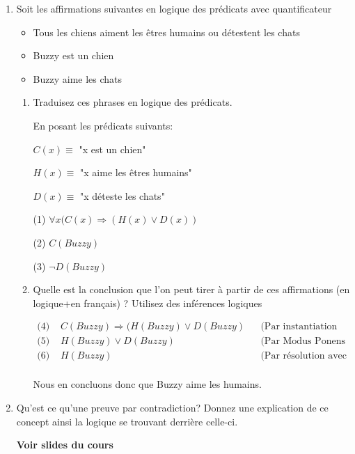 \documentclass[A4paper,11pt]{article}
\begin{document}
\begin{enumerate}
    \item Soit les affirmations suivantes en logique des prédicats avec quantificateur
    \begin{itemize}
        \item Tous les chiens aiment les êtres humains ou détestent les chats
        \item Buzzy est un chien
        \item Buzzy aime les chats
    \end{itemize}
    \begin{enumerate}
        \item Traduisez ces phrases en logique des prédicats.
        
        En posant les prédicats suivants:
        
        $C(x) \equiv$ "x est un chien"
        
        $H(x) \equiv$ "x aime les êtres humains"
        
        $D(x) \equiv$ "x déteste les chats"
        
        (1) $\forall x (C(x) \Rightarrow (H(x) \lor D(x))$
        
        (2) $C(Buzzy)$
        
        (3) $\neg D(Buzzy)$
        \item Quelle est la conclusion que l'on peut tirer à partir de ces affirmations (en logique+en français) ? Utilisez des inférences logiques
        
        \begin{align*}
            \text{(4) }& C(Buzzy) \Rightarrow (H(Buzzy) \lor D(Buzzy) && \text{(Par instantiation universelle)}\\
            \text{(5) }& H(Buzzy) \lor D(Buzzy) && \text{(Par Modus Ponens avec (2) et (4))}\\
            \text{(6) }& H(Buzzy) && \text{(Par résolution avec (3) et (5))}\\
        \end{align*}
        
        Nous en concluons donc que Buzzy aime les humains.
    \end{enumerate}
    \item Qu'est ce qu'une preuve par contradiction? Donnez une explication de ce concept ainsi la logique se trouvant derrière celle-ci.
    
    \textbf{Voir slides du cours}
\end{enumerate}
\end{document}
